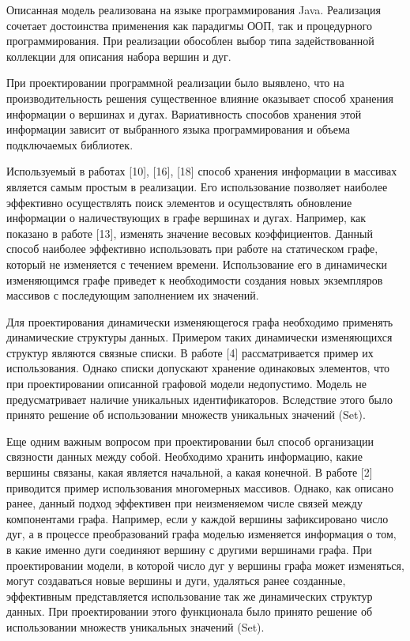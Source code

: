 Описанная модель реализована на языке программирования Java. Реализация сочетает достоинства применения как парадигмы ООП, так и процедурного программирования. При реализации обособлен выбор типа задействованной коллекции для описания набора вершин и дуг.

При проектировании программной реализации было выявлено, что на производительность решения существенное влияние оказывает способ хранения информации о вершинах и дугах. Вариативность способов хранения этой информации зависит от выбранного языка программирования и объема подключаемых библиотек.

Используемый в работах [10], [16], [18] способ хранения информации в массивах является самым простым в реализации. Его использование позволяет наиболее эффективно осуществлять поиск элементов и осуществлять обновление информации о наличествующих в графе вершинах и дугах. Например, как показано в работе [13], изменять значение весовых коэффициентов. Данный способ наиболее эффективно использовать при работе на статическом графе, который не изменяется с течением времени. Использование его в динамически изменяющимся графе приведет к необходимости создания новых экземпляров массивов с последующим заполнением их значений.

Для проектирования динамически изменяющегося графа необходимо применять динамические структуры данных. Примером таких динамически изменяющихся структур являются связные списки. В работе [4] рассматривается пример их использования. Однако списки допускают хранение одинаковых элементов, что при проектировании описанной графовой модели недопустимо. Модель не предусматривает наличие уникальных идентификаторов. Вследствие этого было принято решение об использовании множеств уникальных значений (Set).

Еще одним важным вопросом при проектировании был способ организации связности данных между собой. Необходимо хранить информацию, какие вершины связаны, какая является начальной, а какая конечной. В работе [2] приводится пример использования многомерных массивов. Однако, как описано ранее, данный подход эффективен при неизменяемом числе связей между компонентами графа. Например, если у каждой вершины зафиксировано число дуг, а в процессе преобразований графа моделью изменяется информация о том, в какие именно дуги соединяют вершину с другими вершинами графа. При проектировании модели, в которой число дуг у вершины графа может изменяться, могут создаваться новые вершины и дуги, удаляться ранее созданные, эффективным представляется использование так же динамических структур данных. При проектировании этого функционала было принято решение об использовании множеств уникальных значений (Set).

